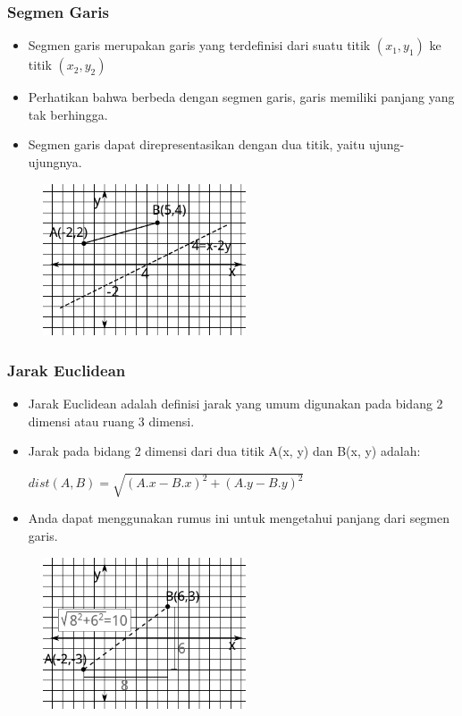 \begin{frame}
\frametitle{Segmen Garis}
\begin{itemize}
  \item Segmen garis merupakan garis yang terdefinisi dari suatu titik $(x_1, y_1)$ ke titik $(x_2, y_2)$
  \item Perhatikan bahwa berbeda dengan segmen garis, garis memiliki panjang yang tak berhingga.
  \item Segmen garis dapat direpresentasikan dengan dua titik, yaitu ujung-ujungnya.
\end{itemize}
\begin{figure}
  \includegraphics[width=6cm]{asset/line-vs-line-segment.pdf}
\end{figure}
\end{frame}

\begin{frame}
\frametitle{Jarak Euclidean}
\begin{itemize}
  \item Jarak Euclidean adalah definisi jarak yang umum digunakan pada bidang 2 dimensi atau ruang 3 dimensi.
  \item Jarak pada bidang 2 dimensi dari dua titik A(x, y) dan B(x, y) adalah:

  \(dist(A, B) = \sqrt{(A.x - B.x)^2 + (A.y - B.y)^2} \)
  \item Anda dapat menggunakan rumus ini untuk mengetahui panjang dari segmen garis.
\end{itemize}
\begin{figure}
  \includegraphics[width=6cm]{asset/euclidean.pdf}
\end{figure}
\end{frame}

